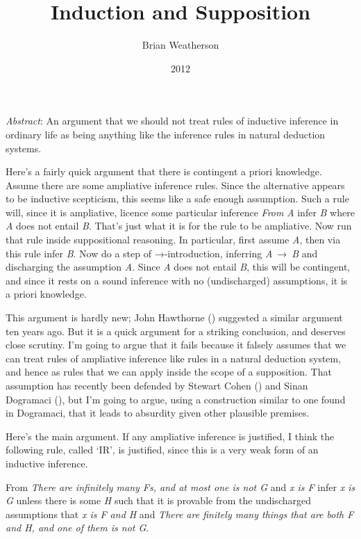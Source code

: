 \documentclass[
  11pt,
  letterpaper,
  DIV=11,
  numbers=noendperiod,
  twoside]{scrartcl}
\title{Induction and Supposition}
\author{Brian Weatherson}
\date{2012}
\providecommand{\tightlist}{%
  \setlength{\itemsep}{0pt}\setlength{\parskip}{0pt}}
\renewenvironment{abstract}
 {\vspace{-1.25cm}
 \quotation\small\noindent\emph{Abstract}:}
 {\endquotation}
\begin{document}
\maketitle
\begin{abstract}
An argument that we should not treat rules of inductive inference in
ordinary life as being anything like the inference rules in natural
deduction systems.
\end{abstract}


Here's a fairly quick argument that there is contingent a priori
knowledge. Assume there are some ampliative inference rules. Since the
alternative appears to be inductive scepticism, this seems like a safe
enough assumption. Such a rule will, since it is ampliative, licence
some particular inference \emph{From} \emph{A} infer \emph{B} where
\emph{A} does not entail \emph{B}. That's just what it is for the rule
to be ampliative. Now run that rule inside suppositional reasoning. In
particular, first assume \emph{A}, then via this rule infer \emph{B}.
Now do a step of →-introduction, inferring \emph{A}~→~\emph{B} and
discharging the assumption \emph{A}. Since \emph{A} does not entail
\emph{B}, this will be contingent, and since it rests on a sound
inference with no (undischarged) assumptions, it is a priori knowledge.

This argument is hardly new; John Hawthorne
() suggested a similar argument ten
years ago. But it is a quick argument for a striking conclusion, and
deserves close scrutiny. I'm going to argue that it fails because it
falsely assumes that we can treat rules of ampliative inference like
rules in a natural deduction system, and hence as rules that we can
apply inside the scope of a supposition. That assumption has recently
been defended by Stewart Cohen () and
Sinan Dogramaci (), but I'm going to
argue, using a construction similar to one found in Dogramaci, that it
leads to absurdity given other plausible premises.

Here's the main argument. If any ampliative inference is justified, I
think the following rule, called `IR', is justified, since this is a
very weak form of an inductive inference.

\begin{description}
\tightlist
\item[IR]
From \emph{There are infinitely many Fs, and at most one is not G} and
\emph{x is F} infer \emph{x is G} unless there is some \emph{H} such
that it is provable from the undischarged assumptions that \emph{x is F
and H} and \emph{There are finitely many things that are both F and H,
and one of them is not G}.
\end{description}
\end{document}
